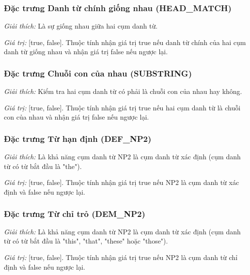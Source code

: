 \documentclass[12pt]{report}
\begin{document}
				\subsubsection*{Đặc trưng Danh từ chính giống nhau (HEAD\_MATCH)}
					\par \textit{Giải thích:} Là sự giống nhau giữa hai cụm danh từ.
					\par \textit{Giá trị:} [true, false]. Thuộc tính nhận giá trị true nếu danh từ chính của hai cụm danh từ giống nhau và nhận giá trị false nếu ngược lại.

				\subsubsection*{Đặc trưng Chuỗi con của nhau (SUBSTRING)}
					\par \textit{Giải thích:} Kiểm tra hai cụm danh từ có phải là chuỗi con của nhau hay không.
					\par \textit{Giá trị:} [true, false]. Thuộc tính nhận giá trị true nếu hai cụm danh từ là chuỗi con của nhau và nhận giá trị false nếu ngược lại.

				\subsubsection*{Đặc trưng Từ hạn định (DEF\_NP2)}
					\par \textit{Giải thích:} Là khả năng cụm danh từ NP2 là cụm danh từ xác định (cụm danh từ có từ bắt đầu là "the"). 
					\par \textit{Giá trị:} [true, false]. Thuộc tính nhận giá trị true nếu NP2 là cụm danh từ xác định và false nếu ngược lại.

				\subsubsection*{Đặc trưng Từ chỉ trỏ (DEM\_NP2)}
					\par \textit{Giải thích:} Là khả năng cụm danh từ NP2 là cụm danh từ xác định (cụm danh từ có từ bắt đầu là "this", "that", "these" hoặc "those"). 
					\par \textit{Giá trị:} [true, false]. Thuộc tính nhận giá trị true nếu NP2 là cụm danh từ chỉ định và false nếu ngược lại.
\end{document}
